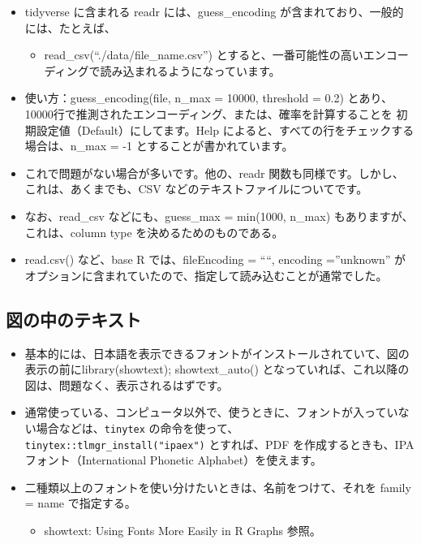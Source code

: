 \documentclass[
  xelatex, ja=standard]{bxjsbook}
\providecommand{\tightlist}{%
  \setlength{\itemsep}{0pt}\setlength{\parskip}{0pt}}
\theoremstyle{definition}
\theoremstyle{definition}
\theoremstyle{definition}
\theoremstyle{definition}
\theoremstyle{remark}
\begin{document}
\begin{itemize}
\tightlist
\item
  tidyverse に含まれる readr には、guess\_encoding が含まれており、一般的には、たとえば、

  \begin{itemize}
  \tightlist
  \item
    read\_csv(``./data/file\_name.csv'') とすると、一番可能性の高いエンコーディングで読み込まれるようになっています。
  \end{itemize}
\item
  使い方：guess\_encoding(file, n\_max = 10000, threshold = 0.2) とあり、10000行で推測されたエンコーディング、または、確率を計算することを 初期設定値（Default）にしてます。Help によると、すべての行をチェックする場合は、n\_max = -1 とすることが書かれています。
\item
  これで問題がない場合が多いです。他の、readr 関数も同様です。しかし、これは、あくまでも、CSV などのテキストファイルについてです。
\item
  なお、read\_csv などにも、guess\_max = min(1000, n\_max) もありますが、これは、column type を決めるためのものである。
\item
  read.csv() など、base R では、fileEncoding = ````, encoding =''unknown'' がオプションに含まれていたので、指定して読み込むことが通常でした。
\end{itemize}

\hypertarget{ux56f3ux306eux4e2dux306eux30c6ux30adux30b9ux30c8}{%
\subsection{図の中のテキスト}\label{ux56f3ux306eux4e2dux306eux30c6ux30adux30b9ux30c8}}

\begin{itemize}
\tightlist
\item
  基本的には、日本語を表示できるフォントがインストールされていて、図の表示の前にlibrary(showtext); showtext\_auto() となっていれば、これ以降の図は、問題なく、表示されるはずです。
\item
  通常使っている、コンピュータ以外で、使うときに、フォントが入っていない場合などは、\texttt{tinytex} の命令を使って、\texttt{tinytex::tlmgr\_install("ipaex")} とすれば、PDF を作成するときも、IPA フォント（International Phonetic Alphabet）を使えます。
\item
  二種類以上のフォントを使い分けたいときは、名前をつけて、それを family = name で指定する。

  \begin{itemize}
  \tightlist
  \item
    showtext: Using Fonts More Easily in R Graphs 参照。
  \end{itemize}
\end{itemize}
\end{document}
